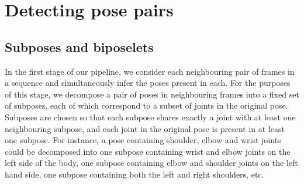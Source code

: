 \documentclass[runningheads]{llncs}
\begin{document}
\section{Detecting pose pairs}


\subsection{Subposes and biposelets}\label{sec:decomp}

In the first stage of our pipeline, we consider each neighbouring pair of frames
in a sequence and simultaneously infer the poses present in each. For the
purposes of this stage, we decompose a pair of poses in neighbouring frames into
a fixed set of subposes, each of which correspond to a subset of joints in the
original pose. Subposes are chosen so that each subpose shares exactly a joint
with at least one neighbouring subpose, and each joint in the original pose is
present in at least one subpose. For instance, a pose containing shoulder, elbow
and wrist joints could be decomposed into one subpose containing wrist and elbow
joints on the left side of the body, one subpose containing elbow and shoulder
joints on the left hand side, one subpose containing both the left and right
shoulders, etc.
\end{document}
